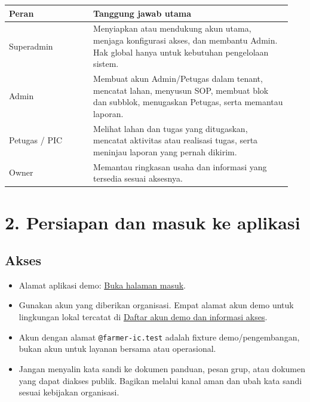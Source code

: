 \documentclass[11pt,a4paper]{article}
\begin{document}
\begin{longtable}{p{0.28\linewidth}p{0.66\linewidth}}\toprule

Peran & Tanggung jawab utama \\

\midrule

Superadmin & Menyiapkan atau mendukung akun utama, menjaga konfigurasi akses, dan membantu Admin. Hak global hanya untuk kebutuhan pengelolaan sistem. \\

Admin & Membuat akun Admin/Petugas dalam tenant, mencatat lahan, menyusun SOP, membuat blok dan subblok, menugaskan Petugas, serta memantau laporan. \\

Petugas / PIC & Melihat lahan dan tugas yang ditugaskan, mencatat aktivitas atau realisasi tugas, serta meninjau laporan yang pernah dikirim. \\

Owner & Memantau ringkasan usaha dan informasi yang tersedia sesuai aksesnya. \\

\bottomrule\end{longtable}

\section{2. Persiapan dan masuk ke aplikasi}

\subsection{Akses}

\begin{itemize}

\item Alamat aplikasi demo: \href{https://farmer.icdigital.io/login}{Buka halaman masuk}.

\item Gunakan akun yang diberikan organisasi. Empat alamat akun demo untuk lingkungan lokal tercatat di \href{demo-seed-credentials.md}{Daftar akun demo dan informasi akses}.

\item Akun dengan alamat \texttt{@farmer-ic.test} adalah fixture demo/pengembangan, bukan akun untuk layanan bersama atau operasional.

\item Jangan menyalin kata sandi ke dokumen panduan, pesan grup, atau dokumen yang dapat diakses publik. Bagikan melalui kanal aman dan ubah kata sandi sesuai kebijakan organisasi.

\end{itemize}
\end{document}
